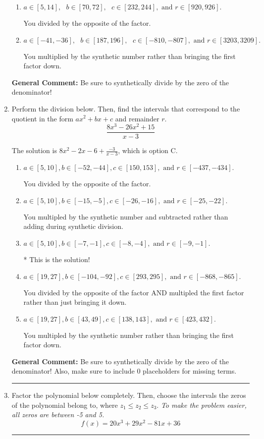\documentclass{extbook}[14pt]
\newcommand{\litem}[1]{\item #1

\rule{\textwidth}{0.4pt}}
\begin{document}
\begin{enumerate}
{\begin{enumerate}[label=\Alph*.]
 You multiplied by the synthetic number and subtracted rather than adding during synthetic division.
\item \( a \in [5, 14], \text{   } b \in [70, 72], \text{   } c \in [232, 244], \text{   and   } r \in [920, 926]. \)

 You divided by the opposite of the factor.
\item \( a \in [-41, -36], \text{   } b \in [187, 196], \text{   } c \in [-810, -807], \text{   and   } r \in [3203, 3209]. \)

 You multiplied by the synthetic number rather than bringing the first factor down.
\end{enumerate}

\textbf{General Comment:} Be sure to synthetically divide by the zero of the denominator!
}
\litem{
Perform the division below. Then, find the intervals that correspond to the quotient in the form $ax^2+bx+c$ and remainder $r$.
\[ \frac{8x^{3} -26 x^{2} + 15}{x -3} \]

The solution is \( 8x^{2} -2 x -6 + \frac{-3}{x -3} \), which is option C.\begin{enumerate}[label=\Alph*.]
\item \( a \in [5, 10], b \in [-52, -44], c \in [150, 153], \text{ and } r \in [-437, -434]. \)

 You divided by the opposite of the factor.
\item \( a \in [5, 10], b \in [-15, -5], c \in [-26, -16], \text{ and } r \in [-25, -22]. \)

 You multipled by the synthetic number and subtracted rather than adding during synthetic division.
\item \( a \in [5, 10], b \in [-7, -1], c \in [-8, -4], \text{ and } r \in [-9, -1]. \)

* This is the solution!
\item \( a \in [19, 27], b \in [-104, -92], c \in [293, 295], \text{ and } r \in [-868, -865]. \)

 You divided by the opposite of the factor AND multipled the first factor rather than just bringing it down.
\item \( a \in [19, 27], b \in [43, 49], c \in [138, 143], \text{ and } r \in [423, 432]. \)

 You multipled by the synthetic number rather than bringing the first factor down.
\end{enumerate}

\textbf{General Comment:} Be sure to synthetically divide by the zero of the denominator! Also, make sure to include 0 placeholders for missing terms.
}
\litem{
Factor the polynomial below completely. Then, choose the intervals the zeros of the polynomial belong to, where $z_1 \leq z_2 \leq z_3$. \textit{To make the problem easier, all zeros are between -5 and 5.}
\[ f(x) = 20x^{3} +29 x^{2} -81 x + 36 \]

}
\end{enumerate}
\end{document}
